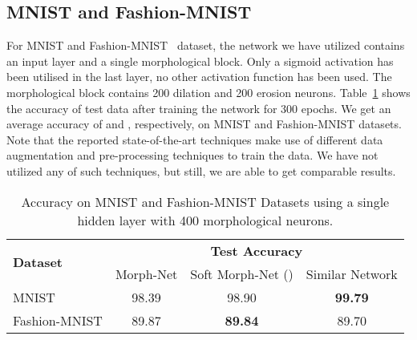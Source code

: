 \documentclass{bmvc2k}
\begin{document}
\subsection{MNIST and Fashion-MNIST} 
For MNIST and Fashion-MNIST~\cite{xiao2017fashion} dataset, the network we have utilized contains an input layer and a single morphological block. Only a sigmoid activation has been utilised in the last layer, no other activation function has been used. The morphological block contains 200 dilation and 200 erosion neurons.
Table~\ref{tab:mnists} shows the accuracy of test data after training the network for 300 epochs. We get an average accuracy of  and , respectively, on MNIST and Fashion-MNIST datasets. Note that the reported state-of-the-art techniques make use of different data augmentation and pre-processing techniques to train the data.  We have not utilized any of such techniques, but still, we are able to get comparable results.  


\begin{table}
    \centering
    \label{tab:mnists}
\begin{tabular}[c]{lccc}
        \toprule
        \multirow{2}{*}{\textbf{Dataset}} & \multicolumn{3}{c}{\textbf{Test Accuracy}} \\ \cmidrule{2-4}
        & Morph-Net & Soft Morph-Net () & Similar Network \\ 
        \cmidrule(r){1-1}\cmidrule(lr){2-2}\cmidrule(lr){3-3}\cmidrule(l){4-4}
        MNIST & 98.39 & 98.90 & \textbf{99.79} \cite{wan2013regularization} \\ Fashion-MNIST & 89.87 & \textbf{89.84} & 89.70 \cite{xiao2017fashion} \\
        \bottomrule
    \end{tabular}
    \caption{Accuracy on MNIST and Fashion-MNIST Datasets using a single hidden layer with 400 morphological neurons.}
\end{table}
\end{document}
